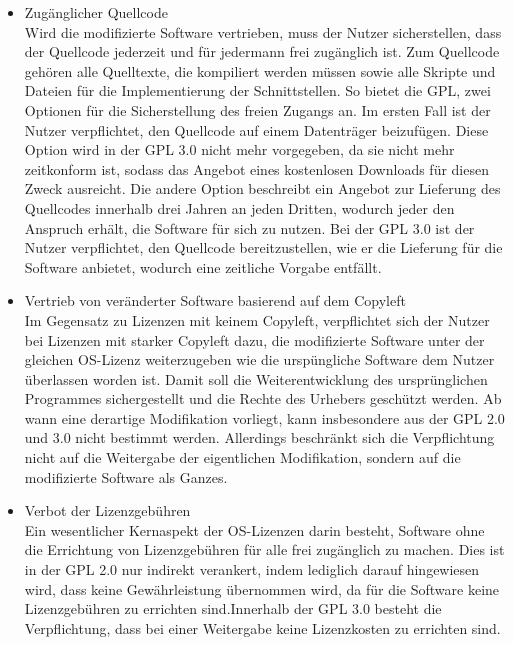 \begin{itemize}
    \item Zugänglicher Quellcode\\
    Wird die modifizierte Software vertrieben, muss der Nutzer sicherstellen, dass der Quellcode jederzeit und für jedermann frei zugänglich ist. Zum Quellcode gehören alle Quelltexte, die kompiliert werden müssen sowie alle Skripte und Dateien für die Implementierung der Schnittstellen. So bietet die GPL, zwei Optionen für die Sicherstellung des freien Zugangs an. Im ersten Fall ist der Nutzer verpflichtet, den Quellcode auf einem Datenträger beizufügen. Diese Option wird in der GPL 3.0 nicht mehr vorgegeben, da sie nicht mehr zeitkonform ist, sodass das Angebot eines kostenlosen Downloads für diesen Zweck ausreicht. Die andere Option beschreibt ein Angebot zur Lieferung des Quellcodes innerhalb drei Jahren an jeden Dritten, wodurch jeder den Anspruch erhält, die Software für sich zu nutzen. Bei der GPL 3.0 ist der Nutzer verpflichtet, den Quellcode bereitzustellen, wie er die Lieferung für die Software anbietet, wodurch eine zeitliche Vorgabe entfällt.  

    \item Vertrieb von veränderter Software basierend auf dem Copyleft\\
    Im Gegensatz zu Lizenzen mit keinem Copyleft, verpflichtet sich der Nutzer bei Lizenzen mit starker Copyleft dazu, die modifizierte Software unter der gleichen OS-Lizenz weiterzugeben wie die urspüngliche Software dem Nutzer überlassen worden ist. Damit soll die Weiterentwicklung des ursprünglichen Programmes sichergestellt und die Rechte des Urhebers geschützt werden. Ab wann eine derartige Modifikation vorliegt, kann insbesondere aus der GPL 2.0 und 3.0 nicht bestimmt werden. Allerdings beschränkt sich die Verpflichtung nicht auf die Weitergabe der eigentlichen Modifikation, sondern auf die modifizierte Software als Ganzes.

    \item Verbot der Lizenzgebühren\\
    Ein wesentlicher Kernaspekt der OS-Lizenzen darin besteht, Software ohne die Errichtung von Lizenzgebühren für alle frei zugänglich zu machen. Dies ist in der GPL 2.0 nur indirekt verankert, indem lediglich darauf hingewiesen wird, dass keine Gewährleistung übernommen wird, da für die Software keine Lizenzgebühren zu errichten sind.Innerhalb der GPL 3.0 besteht die Verpflichtung, dass bei einer Weitergabe keine Lizenzkosten zu errichten sind. 


\end{itemize}
